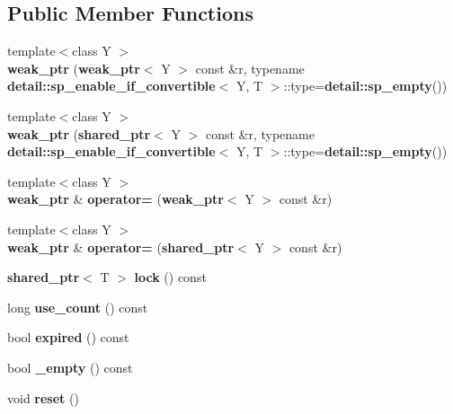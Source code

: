 \subsection*{\-Public \-Member \-Functions}
\begin{DoxyCompactItemize}
\item 
{\footnotesize template$<$class Y $>$ }\\{\bfseries weak\-\_\-ptr} ({\bf weak\-\_\-ptr}$<$ \-Y $>$ const \&r, typename {\bf detail\-::sp\-\_\-enable\-\_\-if\-\_\-convertible}$<$ \-Y, \-T $>$\-::type={\bf detail\-::sp\-\_\-empty}())\label{classbooster_1_1weak__ptr_a024245854350fceeacfd2cc697fa2766}

\item 
{\footnotesize template$<$class Y $>$ }\\{\bfseries weak\-\_\-ptr} ({\bf shared\-\_\-ptr}$<$ \-Y $>$ const \&r, typename {\bf detail\-::sp\-\_\-enable\-\_\-if\-\_\-convertible}$<$ \-Y, \-T $>$\-::type={\bf detail\-::sp\-\_\-empty}())\label{classbooster_1_1weak__ptr_a58ef0b8a6decf6619ad1617a2fa1dfd9}

\item 
{\footnotesize template$<$class Y $>$ }\\{\bf weak\-\_\-ptr} \& {\bfseries operator=} ({\bf weak\-\_\-ptr}$<$ \-Y $>$ const \&r)\label{classbooster_1_1weak__ptr_a6aaf5ebf622698f39eeaa3b26407b941}

\item 
{\footnotesize template$<$class Y $>$ }\\{\bf weak\-\_\-ptr} \& {\bfseries operator=} ({\bf shared\-\_\-ptr}$<$ \-Y $>$ const \&r)\label{classbooster_1_1weak__ptr_a3f90497217adaf9deb61df27c2690a6a}

\item 
{\bf shared\-\_\-ptr}$<$ \-T $>$ {\bfseries lock} () const \label{classbooster_1_1weak__ptr_aaa901127382ac08b3ff9ae1e7d73562b}

\item 
long {\bfseries use\-\_\-count} () const \label{classbooster_1_1weak__ptr_ac56c9a23fd4d8c10577217ce1b67fefb}

\item 
bool {\bfseries expired} () const \label{classbooster_1_1weak__ptr_a6c9ffc68620747ac35daf23abacd03dd}

\item 
bool {\bfseries \-\_\-empty} () const \label{classbooster_1_1weak__ptr_a5542a1c96988b75ed396a7152c61d2dd}

\item 
void {\bfseries reset} ()\label{classbooster_1_1weak__ptr_a9f7c81a5b633fefbf85b884344b93749}


\end{DoxyCompactItemize}
